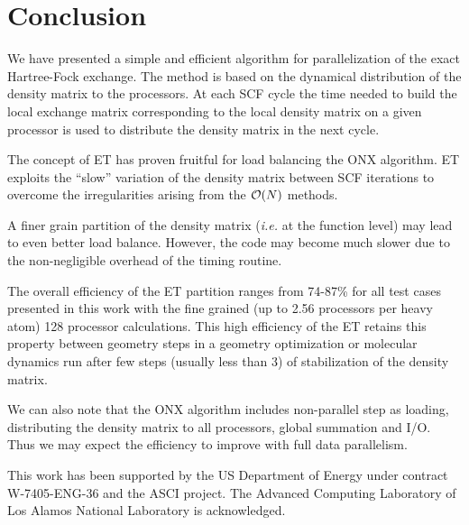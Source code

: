 \documentclass[prl,twocolumn,twocolumngrid,superbib]{revtex4} %
\begin{document}
\section{Conclusion}\label{Sec:Conc}

 We have presented a simple and efficient algorithm for 
 parallelization of the exact Hartree-Fock
 exchange. The method is based on the dynamical distribution 
 of the density matrix to the processors. At each SCF cycle the
 time needed to build the local exchange matrix corresponding
 to the local density matrix on a given processor is used to
 distribute the density matrix in the next cycle. 

 The concept of ET has proven fruitful for load balancing the ONX 
 algorithm. ET exploits the ``slow'' variation of the density matrix 
 between SCF iterations to overcome the irregularities arising 
 from the ${\cal O}(N)$ methods.

 A finer grain partition of the density matrix ({\em i.e.} at the function level)
 may lead to even better load balance. However, the code 
 may become much slower due to the non-negligible overhead 
 of the timing routine.

 The overall efficiency of the ET partition ranges from 74-87\%
 for all test cases presented in this work with the fine grained
 (up to 2.56 processors per heavy atom) 128 processor calculations.
 This high efficiency of the ET retains this property between geometry steps
 in a geometry optimization or molecular dynamics run after
 few steps (usually less than 3) of stabilization of the density matrix.

 We can also note that the ONX algorithm includes non-parallel step as
 loading, distributing the density matrix to all
 processors, global summation and I/O. Thus we may expect 
 the efficiency to improve with full data parallelism.


\begin{acknowledgments}
 This work has been supported by the US Department of Energy
 under contract W-7405-ENG-36 and the ASCI project.
 The Advanced Computing Laboratory of Los
 Alamos National Laboratory is acknowledged.
\end{acknowledgments}

%
\newpage
\end{document}
